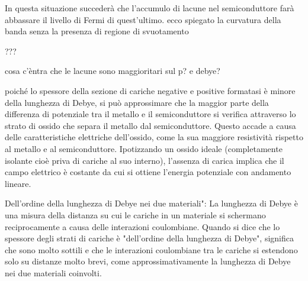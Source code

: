 In questa situazione succederà che l'accumulo di lacune nel semiconduttore farà abbassare il livello di Fermi di quest'ultimo. ecco spiegato la curvatura della banda senza la presenza di regione di svuotamento
\begin{ricevimento}
    ???
\end{ricevimento}

\begin{ricevimento}
    cosa c'èntra che le lacune sono maggioritari sul p? e debye?
\end{ricevimento}

poiché lo spessore della sezione di cariche negative e positive formatasi è minore della lunghezza di Debye, si può approssimare che la maggior parte della differenza di potenziale tra il metallo e il semiconduttore si verifica attraverso lo strato di ossido che separa il metallo dal semiconduttore. Questo accade a causa delle caratteristiche elettriche dell'ossido, come la sua maggiore resistività rispetto al metallo e al semiconduttore.
Ipotizzando un ossido ideale (completamente isolante cioè priva di cariche al suo interno), l'assenza di carica implica che il campo elettrico è costante da cui si ottiene l'energia potenziale con andamento lineare.

\begin{exbox}[da chatgpt]
    Dell'ordine della lunghezza di Debye nei due materiali": La lunghezza di Debye è una misura della distanza su cui le cariche in un materiale si schermano reciprocamente a causa delle interazioni coulombiane. Quando si dice che lo spessore degli strati di cariche è "dell'ordine della lunghezza di Debye", significa che sono molto sottili e che le interazioni coulombiane tra le cariche si estendono solo su distanze molto brevi, come approssimativamente la lunghezza di Debye nei due materiali coinvolti.
\end{exbox}

